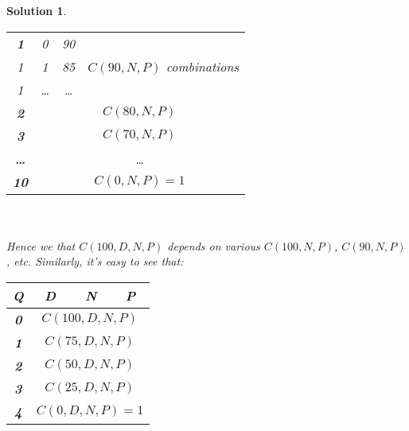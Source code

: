 \documentclass{article}
\newtheorem*{solution*}{Solution}
\begin{document}
\begin{solution*}
\begin{tabular}{|c|c|c|c|}
        \bottomrule
        \textbf{1} & 0 & 90 & \multirow{3}{*}{{
            $C(90, N, P)$ combinations
        }} \\
        \cline{1-3}
        1 & 1 & 85 & \\
        \cline{1-3}
        1 & \dots & \dots & \\

        \bottomrule
        \textbf{2} & \multicolumn{3}{|c|}{{$C(80, N, P)$}} \\

        \bottomrule
        \textbf{3} & \multicolumn{3}{|c|}{{$C(70, N, P)$}} \\

        \bottomrule
        \textbf{\dots} & \multicolumn{3}{|c|}{{\dots}} \\

        \bottomrule
        \textbf{10} & \multicolumn{3}{|c|}{{$$C(0, N, P)=1$$}} \\

        \bottomrule
    \end{tabular}\\\\

    Hence we that $C(100, D, N, P)$ depends on various 
    $C(100, N, P)$, $C(90, N, P)$, etc.
    Similarly, it's easy to see that:\\

    \begin{tabular}{|c|c|c|c|}
        \hline
        Q & D & N & P \\
        \bottomrule
        \textbf{0} & \multicolumn{3}{|c|}{{$$C(100, D, N, P)$$}} \\

        \bottomrule
        \textbf{1} & \multicolumn{3}{|c|}{{$$C(75, D, N, P)$$}} \\

        \bottomrule
        \textbf{2} & \multicolumn{3}{|c|}{{$$C(50, D, N, P)$$}} \\

        \bottomrule
        \textbf{3} & \multicolumn{3}{|c|}{{$$C(25, D, N, P)$$}} \\

        \bottomrule
        \textbf{4} & \multicolumn{3}{|c|}{{$$C(0, D, N, P)=1$$}} \\

        \bottomrule
    \end{tabular}\\\\  

\end{solution*}
\end{document}
